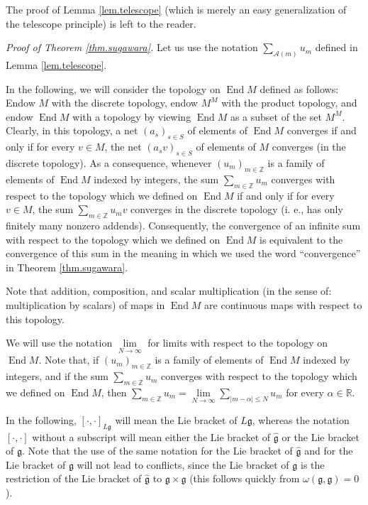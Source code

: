 \documentclass[etingof-lie.tex]{subfiles}
\begin{document}
The proof of Lemma \ref{lem.telescope} (which is merely an easy generalization
of the telescope principle) is left to the reader.

\textit{Proof of Theorem \ref{thm.sugawara}.} Let us use the notation
$\sum\limits_{\mathcal{A}\left(  m\right)  }u_{m}$ defined in Lemma
\ref{lem.telescope}.

In the following, we will consider the topology on $\operatorname*{End}M$
defined as follows: Endow $M$ with the discrete topology, endow $M^{M}$ with
the product topology, and endow $\operatorname*{End}M$ with a topology by
viewing $\operatorname*{End}M$ as a subset of the set $M^{M}$. Clearly, in
this topology, a net $\left(  a_{s}\right)  _{s\in S}$ of elements of
$\operatorname*{End}M$ converges if and only if for every $v\in M$, the net
$\left(  a_{s}v\right)  _{s\in S}$ of elements of $M$ converges (in the
discrete topology). As a consequence, whenever $\left(  u_{m}\right)
_{m\in\mathbb{Z}}$ is a family of elements of $\operatorname*{End}M$ indexed
by integers, the sum $\sum\limits_{m\in\mathbb{Z}}u_{m}$ converges with
respect to the topology which we defined on $\operatorname*{End}M$ if and only
if for every $v\in M$, the sum $\sum\limits_{m\in\mathbb{Z}}u_{m}v$ converges
in the discrete topology (i. e., has only finitely many nonzero addends).
Consequently, the convergence of an infinite sum with respect to the topology
which we defined on $\operatorname*{End}M$ is equivalent to the convergence of
this sum in the meaning in which we used the word ``convergence'' in Theorem
\ref{thm.sugawara}.

Note that addition, composition, and scalar multiplication (in the sense of:
multiplication by scalars) of maps in $\operatorname*{End}M$ are continuous
maps with respect to this topology.

We will use the notation $\lim\limits_{N\rightarrow\infty}$ for limits with
respect to the topology on $\operatorname*{End}M$. Note that, if $\left(
u_{m}\right)  _{m\in\mathbb{Z}}$ is a family of elements of
$\operatorname*{End}M$ indexed by integers, and if the sum $\sum
\limits_{m\in\mathbb{Z}}u_{m}$ converges with respect to the topology which we
defined on $\operatorname*{End}M$, then $\sum\limits_{m\in\mathbb{Z}}%
u_{m}=\lim\limits_{N\rightarrow\infty}\sum\limits_{\left\vert m-\alpha
\right\vert \leq N}u_{m}$ for every $\alpha\in\mathbb{R}$.

In the following, $\left[  \cdot,\cdot\right]  _{L\mathfrak{g}}$ will mean the
Lie bracket of $L\mathfrak{g}$, whereas the notation $\left[  \cdot
,\cdot\right]  $ without a subscript will mean either the Lie bracket of
$\widehat{\mathfrak{g}}$ or the Lie bracket of $\mathfrak{g}$. Note that the
use of the same notation for the Lie bracket of $\widehat{\mathfrak{g}}$ and
for the Lie bracket of $\mathfrak{g}$ will not lead to conflicts, since the
Lie bracket of $\mathfrak{g}$ is the restriction of the Lie bracket of
$\widehat{\mathfrak{g}}$ to $\mathfrak{g}\times\mathfrak{g}$ (this follows
quickly from $\omega\left(  \mathfrak{g},\mathfrak{g}\right)  =0$).
\end{document}
